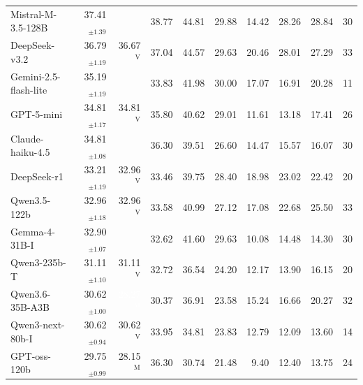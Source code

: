 \begin{tabular}{l @{\hspace{1em}} r r @{\hspace{0.5em}} r r r @{\hspace{0.5em}} r @{\hspace{1em}} r r @{\hspace{1em}} r}
Mistral-M-3.5-128B & 37.41$_{\pm1.39}$ &  & \cellcolor[HTML]{F7F7F7}38.77 & \cellcolor[HTML]{A8D0E4}44.81 & \cellcolor[HTML]{E7876B}29.88 & 14.42 & 28.26 & 28.84 & 30 \\
DeepSeek-v3.2 & 36.79$_{\pm1.19}$ & \cellcolor[HTML]{F8F2EE}36.67$^{\mathrm{V}}$ & \cellcolor[HTML]{F7F7F7}37.04 & \cellcolor[HTML]{8DC2DC}44.57 & \cellcolor[HTML]{F3A381}29.63 & 20.46 & 28.01 & 27.29 & 33 \\
Gemini-2.5-flash-lite & 35.19$_{\pm1.19}$ &  & \cellcolor[HTML]{F7F7F7}33.83 & \cellcolor[HTML]{80BAD8}41.98 & \cellcolor[HTML]{FDD8C4}30.00 & 17.07 & 16.91 & 20.28 & 11 \\
GPT-5-mini & 34.81$_{\pm1.17}$ & \cellcolor[HTML]{F7F7F7}34.81$^{\mathrm{V}}$ & \cellcolor[HTML]{F7F7F7}35.80 & \cellcolor[HTML]{BDDBEA}40.62 & \cellcolor[HTML]{F5AD8C}29.01 & 11.61 & 13.18 & 17.41 & 26 \\
Claude-haiku-4.5 & 34.81$_{\pm1.08}$ &  & \cellcolor[HTML]{F7F7F7}36.30 & \cellcolor[HTML]{D6E7F1}39.51 & \cellcolor[HTML]{E17860}26.60 & 14.47 & 15.57 & 16.07 & 30 \\
DeepSeek-r1 & 33.21$_{\pm1.19}$ & \cellcolor[HTML]{F9ECE4}32.96$^{\mathrm{V}}$ & \cellcolor[HTML]{F7F7F7}33.46 & \cellcolor[HTML]{A4CEE3}39.75 & \cellcolor[HTML]{FAC6AD}28.40 & 18.98 & 23.02 & 22.42 & 20 \\
Qwen3.5-122b & 32.96$_{\pm1.18}$ & \cellcolor[HTML]{F7F7F7}32.96$^{\mathrm{V}}$ & \cellcolor[HTML]{F7F7F7}33.58 & \cellcolor[HTML]{90C4DD}40.99 & \cellcolor[HTML]{F6B292}27.12 & 17.08 & 22.68 & 25.50 & 33 \\
Gemma-4-31B-I & 32.90$_{\pm1.07}$ &  & \cellcolor[HTML]{F7F7F7}32.62 & \cellcolor[HTML]{6EAED2}41.60 & \cellcolor[HTML]{FCE0D0}29.63 & 10.08 & 14.48 & 14.30 & 30 \\
Qwen3-235b-T & 31.11$_{\pm1.10}$ & \cellcolor[HTML]{F7F7F7}31.11$^{\mathrm{V}}$ & \cellcolor[HTML]{F7F7F7}32.72 & \cellcolor[HTML]{CEE4EF}36.54 & \cellcolor[HTML]{EA8E71}24.20 & 12.17 & 13.90 & 16.15 & 20 \\
Qwen3.6-35B-A3B & 30.62$_{\pm1.00}$ & \cellcolor[HTML]{BE3036}\textcolor{white}{28.27$^{\mathrm{M}}$} & \cellcolor[HTML]{F7F7F7}30.37 & \cellcolor[HTML]{9FCCE2}36.91 & \cellcolor[HTML]{F5AD8C}23.58 & 15.24 & 16.66 & 20.27 & 32 \\
Qwen3-next-80b-I & 30.62$_{\pm0.94}$ & \cellcolor[HTML]{F7F7F7}30.62$^{\mathrm{V}}$ & \cellcolor[HTML]{F7F7F7}33.95 & \cellcolor[HTML]{EEF3F5}34.81 & \cellcolor[HTML]{DD7059}23.83 & 12.79 & 12.09 & 13.60 & 14 \\
GPT-oss-120b & 29.75$_{\pm0.99}$ & \cellcolor[HTML]{E58267}28.15$^{\mathrm{M}}$ & \cellcolor[HTML]{B0D4E7}36.30 & \cellcolor[HTML]{F7F7F7}30.74 & \cellcolor[HTML]{E48066}21.48 & 9.40 & 12.40 & 13.75 & 24 \\

\end{tabular}
